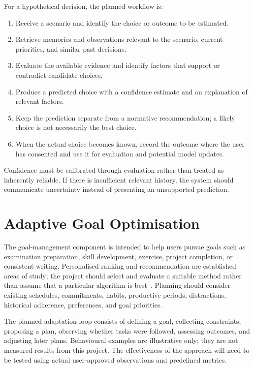 \documentclass{tietreport}
\begin{document}
For a hypothetical decision, the planned workflow is:
\begin{enumerate}[leftmargin=*]
  \item Receive a scenario and identify the choice or outcome to be estimated.
  \item Retrieve memories and observations relevant to the scenario, current priorities, and similar past decisions.
  \item Evaluate the available evidence and identify factors that support or contradict candidate choices.
  \item Produce a predicted choice with a confidence estimate and an explanation of relevant factors.
  \item Keep the prediction separate from a normative recommendation; a likely choice is not necessarily the best choice.
  \item When the actual choice becomes known, record the outcome where the user has consented and use it for evaluation and potential model updates.
\end{enumerate}

Confidence must be calibrated through evaluation rather than treated as inherently reliable. If there is insufficient relevant history, the system should communicate uncertainty instead of presenting an unsupported prediction.

\section{Adaptive Goal Optimisation}
The goal-management component is intended to help users pursue goals such as examination preparation, skill development, exercise, project completion, or consistent writing. Personalised ranking and recommendation are established areas of study; the project should select and evaluate a suitable method rather than assume that a particular algorithm is best~\cite{ricci2015}. Planning should consider existing schedules, commitments, habits, productive periods, distractions, historical adherence, preferences, and goal priorities.

The planned adaptation loop consists of defining a goal, collecting constraints, proposing a plan, observing whether tasks were followed, assessing outcomes, and adjusting later plans. Behavioural examples are illustrative only; they are not measured results from this project. The effectiveness of the approach will need to be tested using actual user-approved observations and predefined metrics.
\end{document}
